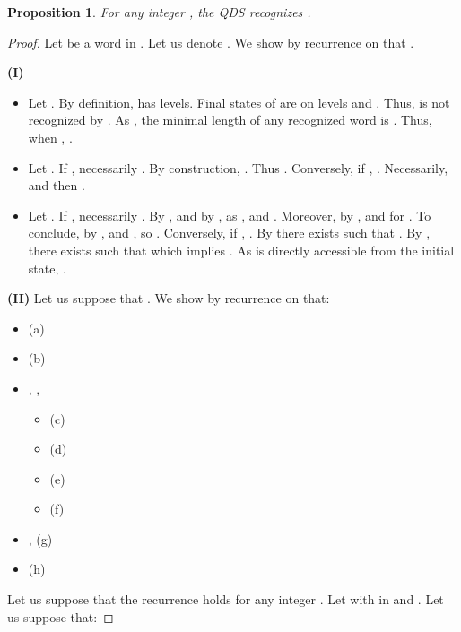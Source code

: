 \documentclass[11pt]{elsarticle}
\newtheorem{proposition}{Proposition}
\begin{document}
\begin{proposition}\label{prop Sk bon lang}
   For any integer , the QDS  recognizes .
\end{proposition}
\begin{proof}
  Let  be a word in . Let us denote . We show by recurrence on  that    .
  
\textbf{(I)} 
  \begin{itemize} 
  \item Let . By definition,  has  levels. Final states of  are on levels  and . Thus,  is not recognized by . As , the minimal length of any recognized word is . Thus, when , . 
 \item Let . If , necessarily . By construction, . Thus . Conversely, if , . Necessarily,  and then . 
\item Let .  If , necessarily . By ,   and by , as ,  and . Moreover, by ,  and  for . To conclude, by ,  and , so . Conversely, if , . By  there exists  such that . By , there exists  such that  which implies . As  is directly accessible from the initial state, .
  \end{itemize}
  \textbf{(II)} Let us suppose that . We show by recurrence on  that: 
  \begin{itemize}
    \item   \hfill (a)
    \item   \hfill (b)
    \item , , 
      \begin{itemize}
        \item    \hfill (c)
        \item   \hfill (d)
        \item   \hfill (e)
        \item   \hfill (f)
      \end{itemize}
    \item ,   \hfill (g)  
    \item   \hfill (h)
  \end{itemize}
  


Let us suppose that the recurrence  holds for any integer . Let  with  in  and . Let us suppose that:
  

\end{proof}
\end{document}

